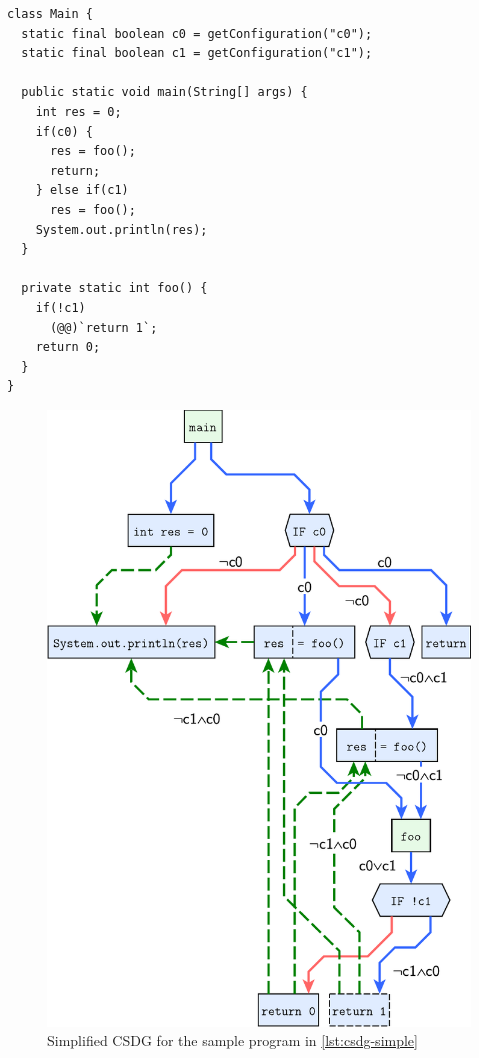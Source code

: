 \begin{lstlisting}[float=p,label=lst:csdg-simple,
  caption={Program using load-time variability resulting in the SDG in \autoref{fig:csdg-simple}}]
class Main {
  static final boolean c0 = getConfiguration("c0");
  static final boolean c1 = getConfiguration("c1");
  
  public static void main(String[] args) {
    int res = 0;
    if(c0) {
      res = foo();
      return;
    } else if(c1)
      res = foo();
    System.out.println(res);
  }
  
  private static int foo() {
    if(!c1)
      (@@)`return 1`;
    return 0;
  }
}
\end{lstlisting}

\begin{figure}[p]
  \centering
    \includegraphics[scale=0.6]{sdgs/simple-csdg}
  \caption{Simplified CSDG for the sample program in \autoref{lst:csdg-simple}}
  \label{fig:csdg-simple}
\end{figure}
